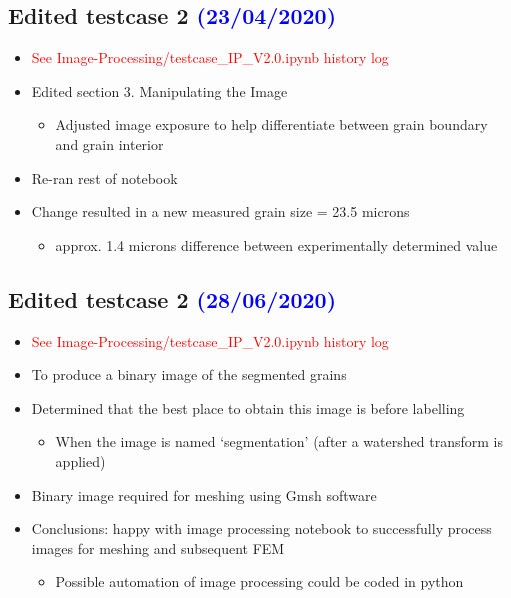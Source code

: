 \documentclass{article}
\begin{document}
\subsection{Edited testcase 2 \textcolor{blue}{(23/04/2020)}}

\begin{itemize}
\item \textcolor{red}{See Image-Processing/testcase\_IP\_V2.0.ipynb history log}
\item Edited section 3. Manipulating the Image
\begin{itemize}
\item Adjusted image exposure to help differentiate between grain boundary and grain interior
\end{itemize}
\item Re-ran rest of notebook
\item Change resulted in a new measured grain size = 23.5 microns 
\begin{itemize}
\item  approx. 1.4 microns difference between experimentally determined value
\end{itemize}
\end{itemize}

\subsection{Edited testcase 2 \textcolor{blue}{(28/06/2020)}}

\begin{itemize}
\item \textcolor{red}{See Image-Processing/testcase\_IP\_V2.0.ipynb history log}
\item To produce a binary image of the segmented grains
\item Determined that the best place to obtain this image is before labelling 
\begin{itemize}
\item When the image is named ‘segmentation’ (after a watershed transform is applied)
\end{itemize}
\item Binary image required for meshing using Gmsh software
\item Conclusions: happy with image processing notebook to successfully process images for meshing and subsequent FEM
\begin{itemize}
\item Possible automation of image processing could be coded in python
\end{itemize}
\end{itemize}
\end{document}
